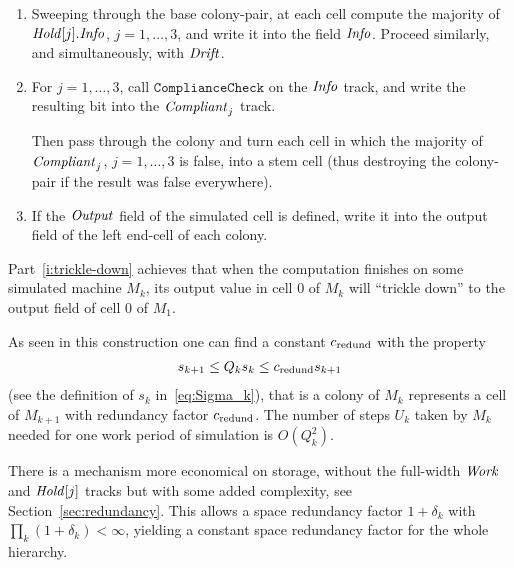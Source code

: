 \documentclass[11pt]{memoir}
\theoremstyle{definition} %
\renewcommand{\le}{\leq}
\newcommand{\fld}[1]{\ensuremath{\textit{#1\/}}}
\newcommand{\rul}[1]{\ensuremath{\texttt{#1}}}
\def\U{U}
\newcommand{\Q}{Q} %
\newcommand{\Drift}{\fld{Drift}}
\newcommand{\Hold}{\fld{Hold}}
\newcommand{\Info}{\fld{Info}}
\newcommand{\Output}{\fld{Output}}
\newcommand{\Work}{\fld{Work}} %
\newcommand{\cns}[1]{c_{\textrm{\upshape #1}}}
\newcommand{\CRedund}{\cns{redund}}
\begin{document}
\begin{enumerate}
\begin{enumerate}
        \end{enumerate}

       \item
            Sweeping through the base colony-pair,
            at each cell compute the majority of \( \Hold[j].\Info \), \( j=1,\dots,3 \),
            and write it into the field \( \Info \).
            Proceed similarly, and simultaneously, with \( \Drift \).

       \item       For \( j=1,\dots,3 \), call \( \rul{ComplianceCheck} \) on the \( \Info \) track, and
write the resulting bit into the \( \fld{Compliant}_{j} \) track.

Then pass through the colony and turn each cell in which the majority 
of \( \fld{Compliant}_{j} \), \( j=1,\dots,3 \) is false,
into a stem cell (thus destroying the colony-pair if the result was false everywhere).


 \item\label{i:trickle-down} If the \( \Output \) field of the simulated cell is defined, write it
   into the output field of the left end-cell of each colony.
   
\end{enumerate}

Part~\ref{i:trickle-down} achieves that when the computation finishes on some
simulated machine \( M_{k} \),
its output value in cell 0 of \( M_{k} \) will ``trickle down'' to the output field of  cell 0 of \( M_{1} \).

As seen in this construction one can find a constant \( \CRedund \) with the property
\begin{align}\label{eq:redund}
    s_{k+1}\le\Q_{k}s_{k}\le \CRedund s_{k+1}
\end{align}
(see the definition of \( s_{k} \) in~\eqref{eq:Sigma_k}),
that is a colony of \( M_{k} \) represents a cell of \( M_{k+1} \) with redundancy
factor \( \CRedund \).
The number of steps \( \U_{k} \) taken by \( M_{k} \) needed for one work period
of simulation is \( O(\Q_{k}^{2}) \).

\begin{remark}
  There is a mechanism more economical on storage, without the full-width
  \( \Work \) and \( \Hold[j] \) tracks but with some
  added complexity, see Section~\ref{sec:redundancy}.
  This allows a space redundancy factor \( 1+\delta_{k} \) with \( \prod_{k}(1+\delta_{k})<\infty \),
  yielding a constant space redundancy factor for the whole hierarchy.
\end{remark}
\end{document}
